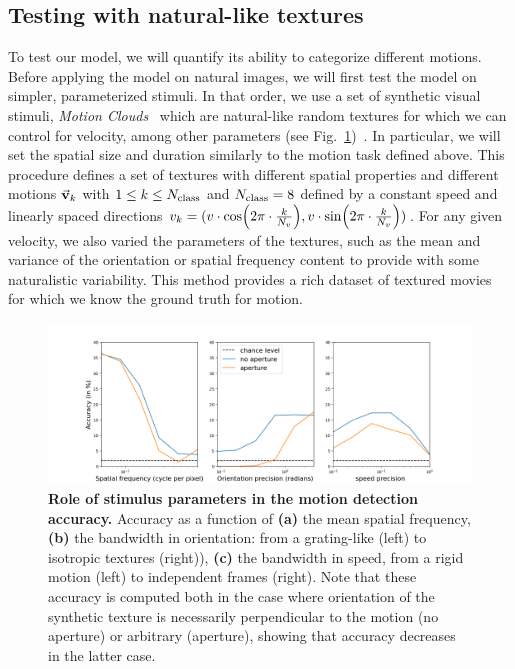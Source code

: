 \documentclass[default]{sn-jnl}%
\theoremstyle{thmstyleone}%
\theoremstyle{thmstyletwo}%
\theoremstyle{thmstylethree}%
\newcommand{\seeFig}[1]{see Fig.~\ref{fig:#1}}%
\begin{document}
\subsection{Testing with natural-like textures}
To test our model, we will quantify its ability to categorize different motions. Before applying the model on natural images, we will first test the model on simpler, parameterized stimuli. In that order, we use a set of synthetic visual stimuli, \textit{Motion Clouds}~\citep{leon_motion_2012} which are natural-like random textures for which we can control for velocity, among other parameters (\seeFig{motion_clouds})~\citep{vacher_bayesian_2018}. In particular, we will set the spatial size and duration similarly to the motion task defined above.
This procedure defines a set of textures with different spatial properties and different motions $\va{v}_k$ with  $1 \le k \le N_\text{class}$ and $N_\text{class}=8$ defined by a constant speed and linearly spaced directions $
v_k = 
  ( 
    v \cdot \cos(2\pi\cdot \frac{k}{N_v}),
    v \cdot \sin(2\pi\cdot \frac{k}{N_v})
  )
$.
For any given velocity, we also varied the parameters of the textures, such as the mean and variance of the orientation or spatial frequency content to provide with some naturalistic variability. This method provides a rich dataset of textured movies for which we know the ground truth for motion.
\begin{figure}%
    \centering
    \includegraphics[width=0.99\linewidth]{figures/2022-09-27_MotionDetection_motion_clouds.png}%
    \caption{{\bf Role of stimulus parameters in the motion detection accuracy.} Accuracy as a function of {\bf (a)} the mean spatial frequency, {\bf (b)} the bandwidth in orientation: from a grating-like (left) to isotropic textures (right)), {\bf (c)} the bandwidth in speed, from a rigid motion (left) to independent frames (right). Note that these accuracy is computed both in the case where orientation of the synthetic texture is necessarily perpendicular to the motion (no aperture) or arbitrary (aperture), showing that accuracy decreases in the latter case.}
    \label{fig:motion_clouds}
\end{figure}
\end{document}
